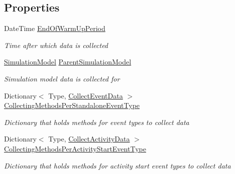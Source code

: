 \subsection*{Properties}
\begin{DoxyCompactItemize}
\item 
Date\+Time \hyperlink{class_simulation_core_1_1_model_log_1_1_generic_output_genereator_adc657e74cabd69839520c36abefe8b7b}{End\+Of\+Warm\+Up\+Period}
\begin{DoxyCompactList}\small\item\em Time after which data is collected \end{DoxyCompactList}\item 
\hyperlink{class_simulation_core_1_1_simulation_classes_1_1_simulation_model}{Simulation\+Model} \hyperlink{class_simulation_core_1_1_model_log_1_1_generic_output_genereator_a7af7fadff3b796a1f5c73a8b0033f3a5}{Parent\+Simulation\+Model}
\begin{DoxyCompactList}\small\item\em Simulation model data is collected for \end{DoxyCompactList}\item 
Dictionary$<$ Type, \hyperlink{class_simulation_core_1_1_model_log_1_1_generic_output_genereator_ada813b048eeac074d6d84668d33f384e}{Collect\+Event\+Data} $>$ \hyperlink{class_simulation_core_1_1_model_log_1_1_generic_output_genereator_af9dd2fe431d0d8f39cdd5f5c3a7fb73f}{Collecting\+Methods\+Per\+Standalone\+Event\+Type}
\begin{DoxyCompactList}\small\item\em Dictionary that holds methods for event types to collect data \end{DoxyCompactList}\item 
Dictionary$<$ Type, \hyperlink{class_simulation_core_1_1_model_log_1_1_generic_output_genereator_a0270699b86c929ca3021962550625514}{Collect\+Activity\+Data} $>$ \hyperlink{class_simulation_core_1_1_model_log_1_1_generic_output_genereator_abec6fe77c7647337b06ca8b19a1a5b2f}{Collecting\+Methods\+Per\+Activity\+Start\+Event\+Type}
\begin{DoxyCompactList}\small\item\em Dictionary that holds methods for activity start event types to collect data \end{DoxyCompactList}\item 

\end{DoxyCompactItemize}
